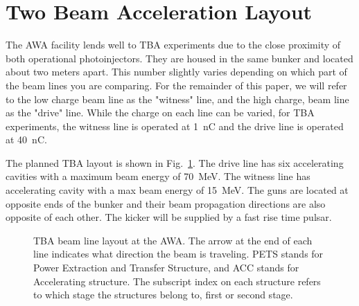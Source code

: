 \documentclass[letterpaper,  %
              ]{jacow-2_3}   %
\begin{document}
\section{Two Beam Acceleration Layout}
The AWA facility lends well to TBA experiments due to the 
close proximity of both operational photoinjectors. 
They are housed in the same bunker and located about two meters apart.
This number slightly varies depending on which part of the beam 
lines you are comparing. For the remainder of this paper, we will
refer to the low charge beam line as the "witness" line, 
and the high charge, beam line as the "drive" line.
While the charge on each line can be varied, for TBA experiments, 
the witness line is operated at \SI{1}{nC} and the drive line
is operated at \SI{40}{nC}.

The planned TBA layout is shown in Fig.~\ref{beamline}.
The drive line has six accelerating 
cavities with a maximum beam energy of \SI{70}{MeV}. 
The witness line has accelerating cavity with a max beam energy of \SI{15}{MeV}.
The guns are located at opposite ends of the bunker and their beam propagation 
directions are also opposite of each other. The kicker will be supplied 
by a fast rise time pulsar. 

\begin{figure}[!tbh]
	\centering
	\begin{tikzpicture}[scale=\textwidth/33cm, text=black]
	
	\end{tikzpicture}
	\caption{TBA beam line layout at the AWA. The arrow at the end of each line indicates what direction the beam is traveling.
		PETS stands for Power Extraction and Transfer Structure, and ACC
		stands for Accelerating structure. The subscript index on each structure refers to which stage the structures belong to, first or second stage. }
	\label{beamline}
\end{figure}
\end{document}
